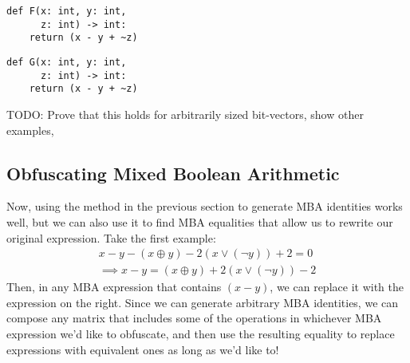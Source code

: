 \noindent
\begin{minipage}{.5\textwidth}
    \begin{small}
    \begin{framed}
        \begin{verbatim}
def F(x: int, y: int,
      z: int) -> int:
    return (x - y + ~z)
        \end{verbatim}
    \end{framed}
    \end{small}
\end{minipage}%
\begin{minipage}{.5\textwidth}
    \begin{framed}
        \begin{small}
        \begin{verbatim}
def G(x: int, y: int,
      z: int) -> int:
    return (x - y + ~z)
        \end{verbatim}
        \end{small}
    \end{framed}
\end{minipage}
{\color{blue} TODO: Prove that this holds for arbitrarily sized bit-vectors, show other 
examples, }
\subsection{Obfuscating Mixed Boolean Arithmetic}
Now, using the method in the previous section to generate MBA identities works well,
but we can also use it to find MBA equalities that allow us to rewrite our original
expression. Take the first example:
\begin{align*} 
    x - y - (x \oplus y) -2(x \lor (\neg y)) + 2 = 0\\
    \implies x - y = (x \oplus y) + 2(x \lor (\neg y)) - 2
\end{align*}
Then, in any MBA expression that contains $(x - y)$, we can replace it with
the expression on the right. Since we can generate arbitrary MBA identities, 
we can compose any matrix that includes some of the operations in whichever
MBA expression we'd like to obfuscate, and then use the resulting equality
to replace expressions with equivalent ones as long as we'd like to! 
